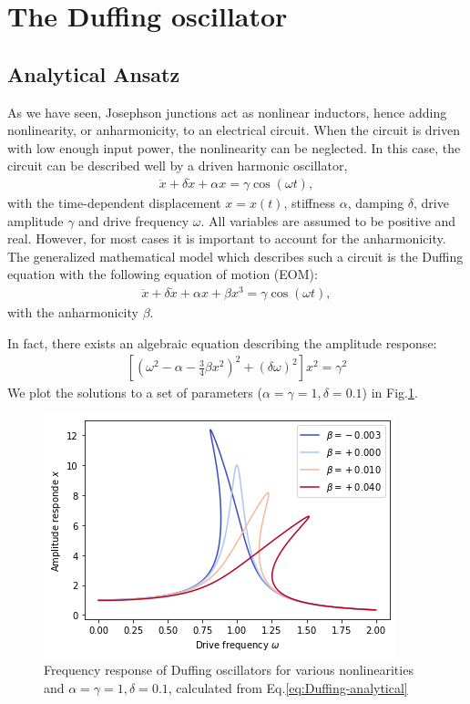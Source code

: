 \section{The Duffing oscillator}

\subsection{Analytical Ansatz}
As we have seen, Josephson junctions act as nonlinear inductors, hence adding nonlinearity, or anharmonicity, to an electrical circuit.
When the circuit is driven with low enough input power, the nonlinearity can be neglected.
In this case, the circuit can be described well by a driven harmonic oscillator,
\begin{align}
\ddot{x} + \delta \dot{x} + \alpha x = \gamma \cos(\omega t),
\end{align}
with the time-dependent displacement  $x=x(t)$, stiffness $\alpha$, damping $\delta$, drive amplitude $\gamma$ and drive frequency $\omega$.
All variables are assumed to be positive and real.
However, for most cases it is important to account for the anharmonicity.
The generalized mathematical model which describes such a circuit is the Duffing equation with the following equation of motion (EOM)\cite{hamelGeorgDuffingIngenieur1921}:
\begin{align}
\ddot{x} + \delta \dot{x} + \alpha x + \beta x^3 = \gamma \cos(\omega t),
\end{align}
with the anharmonicity $\beta$.

In fact, there exists an algebraic equation describing the amplitude response\cite{jordanNonlinearOrdinaryDifferential2007,rajasekarHarmonicNonlinearResonances2016}:
\begin{align}
\left[ \left( \omega^2-\alpha-\frac{3}{4}\beta x^2 \right)^2 + \left( \delta\omega \right)^2 \right] x^2 = \gamma^2
\label{eq:Duffing-analytical}
\end{align}
We plot the solutions to a set of parameters ($\alpha=\gamma=1,\delta=0.1$) in Fig.\ref{fig:duffing}.

\begin{figure}
	\centering
	\includegraphics[width=0.7\linewidth]{chapter-theory/figs-general/duffing}
	\caption{Frequency response of Duffing oscillators for various nonlinearities and $\alpha=\gamma=1,\delta=0.1$, calculated from Eq.\ref{eq:Duffing-analytical}}
	\label{fig:duffing}
\end{figure}

